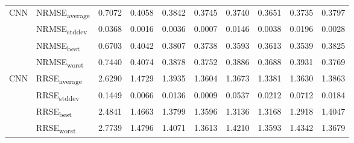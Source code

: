{\begin{longtable}{l l c c c c c c c c}
\cmidrule(lr){2-10}
\multirow{4}{*}{CNN} & NRMSE\textsubscript{average} & 0.7072 & 0.4058 & 0.3842 & 0.3745 & 0.3740 & 0.3651 & 0.3735 & 0.3797 \\
 & NRMSE\textsubscript{stddev} & 0.0368 & 0.0016 & 0.0036 & 0.0007 & 0.0146 & 0.0038 & 0.0196 & 0.0028 \\
 & NRMSE\textsubscript{best} & 0.6703 & 0.4042 & 0.3807 & 0.3738 & 0.3593 & 0.3613 & 0.3539 & 0.3825 \\
 & NRMSE\textsubscript{worst} & 0.7440 & 0.4074 & 0.3878 & 0.3752 & 0.3886 & 0.3688 & 0.3931 & 0.3769 \\
\cmidrule(lr){2-10}
\multirow{4}{*}{CNN} & RRSE\textsubscript{average} & 2.6290 & 1.4729 & 1.3935 & 1.3604 & 1.3673 & 1.3381 & 1.3630 & 1.3863 \\
 & RRSE\textsubscript{stddev} & 0.1449 & 0.0066 & 0.0136 & 0.0009 & 0.0537 & 0.0212 & 0.0712 & 0.0184 \\
 & RRSE\textsubscript{best} & 2.4841 & 1.4663 & 1.3799 & 1.3596 & 1.3136 & 1.3168 & 1.2918 & 1.4047 \\
 & RRSE\textsubscript{worst} & 2.7739 & 1.4796 & 1.4071 & 1.3613 & 1.4210 & 1.3593 & 1.4342 & 1.3679 \\
\cmidrule(lr){2-10}
\end{longtable}
}